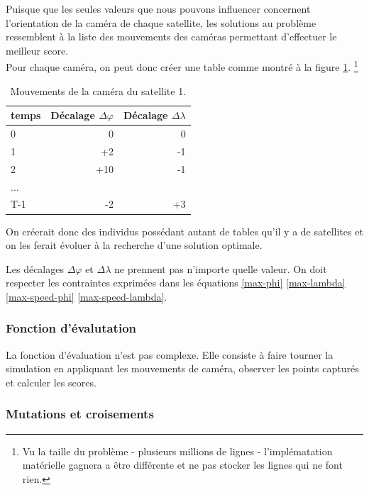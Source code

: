 \documentclass[11pt, oneside]{article}   	%
\begin{document}
Puisque que les seules valeurs que nous pouvons influencer concernent
l'orientation de la caméra de chaque satellite, les solutions au problème
ressemblent à la liste des mouvements des caméras permettant d'effectuer le
meilleur score. \\

Pour chaque caméra, on peut donc créer une table comme montré à la figure
\ref{tab:mouvements}. \footnote{Vu la taille du problème - plusieurs millions
de lignes - l'implématation matérielle gagnera a être différente et ne pas
stocker les lignes qui ne font rien.}

\begin{table}[htb]
\begin{center}
\begin{tabular}{ l | r r}
	temps & Décalage $\Delta\varphi$ & Décalage $\Delta\lambda$ \\
	\hline
 	0 & 0 & 0 \\
	1 & +2 & -1 \\
	2 & +10 & -1 \\
	 \multicolumn{3}{l}{...} \\
	T-1 & -2 & +3 \\
\end{tabular}
\end{center}
\caption{\label{tab:mouvements}Mouvements de la caméra du satellite 1.}
\end{table}

On créerait donc des individus possédant autant de tables qu'il y a de
satellites et on les ferait évoluer à la recherche d'une solution optimale.

Les décalages $\Delta\varphi$ et $\Delta\lambda$ ne prennent pas n'importe
quelle valeur. On doit respecter les contraintes exprimées dans les
équations \eqref{max-phi} \eqref{max-lambda} \eqref{max-speed-phi}
\eqref{max-speed-lambda}. \\

\subsubsection{Fonction d'évalutation}

La fonction d'évaluation n'est pas complexe. Elle consiste à faire tourner
la simulation en appliquant les mouvements de caméra, observer les points
capturés et calculer les scores.

\subsubsection{Mutations et croisements}
\end{document}
